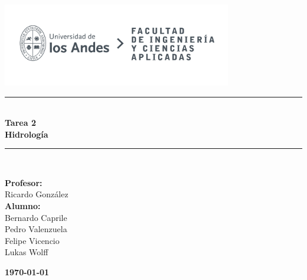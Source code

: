 \documentclass{article}  %
\begin{document}
\begin{titlepage}%
\newcommand{\HRule}{\rule{\linewidth}{0.5mm}} 
\center 
\includegraphics[width=10cm]{LOGO_UNIVERSIDAD.jpg}\\ %
\vspace{3cm}
\HRule \\[0.4cm]
{ \huge \bfseries Tarea 2}\\[0.4cm] %
{ \huge \bfseries Hidrología}\\[0.4cm] %
\HRule \\[1.5cm]
 \vspace{5cm}
\begin{flushright}
    { \textbf{Profesor:}\\
    Ricardo González \\
    \vspace{0.2cm}
    \textbf{Alumno:} \\
    Bernardo Caprile \\
    Pedro Valenzuela \\
    Felipe Vicencio \\
    Lukas Wolff \\
}
\end{flushright}
\vspace{1cm}
{\large \textbf{\today}}\\[2cm] %
\end{titlepage}
\end{document}
